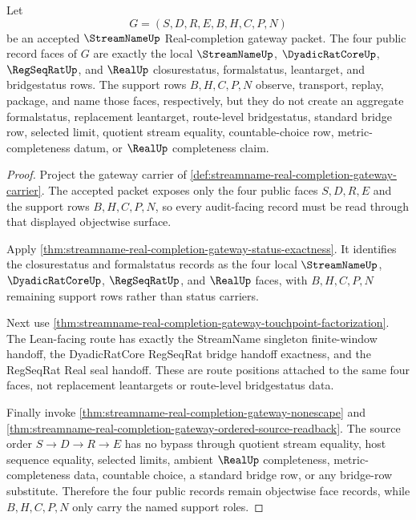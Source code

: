 \begin{theorem}
\label{thm:streamname-real-completion-gateway-face-record-noncollapse}
Let
$$
G=(S,D,R,E,B,H,C,P,N)
$$
be an accepted $\StreamNameUp$ Real-completion gateway packet. The four public record faces of $G$ are exactly the local $\StreamNameUp$, $\DyadicRatCoreUp$, $\RegSeqRatUp$, and $\RealUp$ closurestatus, formalstatus, leantarget, and bridgestatus rows. The support rows $B,H,C,P,N$ observe, transport, replay, package, and name those faces, respectively, but they do not create an aggregate formalstatus, replacement leantarget, route-level bridgestatus, standard bridge row, selected limit, quotient stream equality, countable-choice row, metric-completeness datum, or $\RealUp$ completeness claim.
\end{theorem}
\begin{proof}
Project the gateway carrier of \autoref{def:streamname-real-completion-gateway-carrier}. The accepted packet exposes only the four public faces $S,D,R,E$ and the support rows $B,H,C,P,N$, so every audit-facing record must be read through that displayed objectwise surface.

Apply \autoref{thm:streamname-real-completion-gateway-status-exactness}. It identifies the closurestatus and formalstatus records as the four local $\StreamNameUp$, $\DyadicRatCoreUp$, $\RegSeqRatUp$, and $\RealUp$ faces, with $B,H,C,P,N$ remaining support rows rather than status carriers.

Next use \autoref{thm:streamname-real-completion-gateway-touchpoint-factorization}. The Lean-facing route has exactly the StreamName singleton finite-window handoff, the DyadicRatCore RegSeqRat bridge handoff exactness, and the RegSeqRat Real seal handoff. These are route positions attached to the same four faces, not replacement leantargets or route-level bridgestatus data.

Finally invoke \autoref{thm:streamname-real-completion-gateway-nonescape} and \autoref{thm:streamname-real-completion-gateway-ordered-source-readback}. The source order $S \longrightarrow D \longrightarrow R \longrightarrow E$ has no bypass through quotient stream equality, host sequence equality, selected limits, ambient $\RealUp$ completeness, metric-completeness data, countable choice, a standard bridge row, or any bridge-row substitute. Therefore the four public records remain objectwise face records, while $B,H,C,P,N$ only carry the named support roles.
\end{proof}

